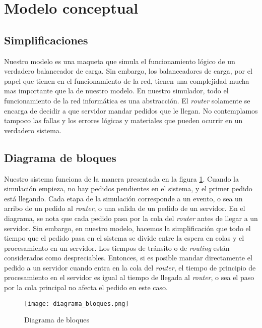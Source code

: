 \section{Modelo conceptual}

\subsection{Simplificaciones}

Nuestro modelo es una maqueta que simula el funcionamiento lógico de un verdadero balanceador de carga. Sin embargo, los
balanceadores de carga, por el papel que tienen en el funcionamiento de la red, tienen una complejidad mucha mas
importante que la de nuestro modelo. En nuestro simulador, todo el funcionamiento de la red informática es una
abstracción. El \textit{router} solamente se encarga de decidir a que servidor mandar pedidos que le llegan. No
contemplamos tampoco las fallas y los errores lógicas y materiales que pueden ocurrir en un verdadero sistema.

\subsection{Diagrama de bloques}

Nuestro sistema funciona de la manera presentada en la figura \ref{fig:diagrama-bloques}. Cuando la simulación empieza,
no hay pedidos pendientes en el sistema, y el primer pedido está llegando. Cada etapa de la simulación corresponde a un
evento, o sea un arribo de un pedido al \textit{router}, o una salida de un pedido de un servidor. En el diagrama, se
nota que cada pedido pasa por la cola del \textit{router} antes de llegar a un servidor. Sin embargo, en nuestro modelo,
hacemos la simplificación que todo el tiempo que el pedido pasa en el sistema se divide entre la espera en colas y el
procesamiento en un servidor. Los tiempos de tránsito o de \textit{routing} están considerados como despreciables.
Entonces, si es posible mandar directamente el pedido a un servidor cuando entra en la cola del \textit{router}, el
tiempo de principio de procesamiento en el servidor es igual al tiempo de llegada al \textit{router}, o sea el paso por
la cola principal no afecta el pedido en este caso.

\begin{figure}[h]
    \centering
    \texttt{[image: diagrama\_bloques.png]}
    \caption{Diagrama de bloques}
    \label{fig:diagrama-bloques}
\end{figure}

